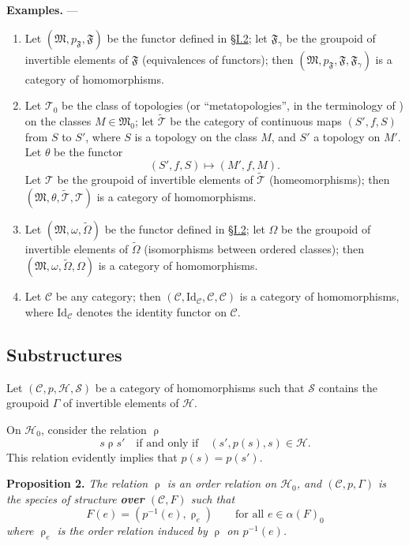 \documentclass[a4paper,oneside,nobib,nofonts,notitlepage,notoc,nols,fleqn,justified]{tufte-book}
\newenvironment{itenv}[1]
  {\phantomsection\par\medskip\noindent\textbf{#1.}\itshape}
  {\par\medskip}
\newenvironment{rmenv}[1]
  {\phantomsection\par\medskip\noindent\textbf{#1.}\rmfamily}
  {\par\medskip}
\newcommand{\oldpage}[1]{{\reversemarginpar\marginnote{\raggedleft\footnotesize\textit{p.~#1}}}}
\newcommand{\unsure}[1]{{\color{purple}\textbf{#1}}}
\newcommand{\CC}{\mathcal{C}}
\newcommand{\HH}{\mathcal{H}}
\renewcommand{\SS}{\mathcal{S}}
\newcommand{\MM}{\mathfrak{M}}
\newcommand{\FF}{\mathfrak{F}}
\newcommand{\TT}{\mathcal{T}}
\newcommand{\relrho}{\mathrel{\rho}}
\newcommand{\Id}{\mathrm{Id}}
\begin{document}
\begin{rmenv}{Examples}
  ---
  \begin{enumerate}
    \item[\normalfont(1)]
      \oldpage{358}
      Let $(\MM,p_\FF,\FF)$ be the functor defined in \hyperref[section:i.2]{§I.2};
      let $\FF_\gamma$ be the groupoid of invertible elements of $\FF$ (equivalences of functors);
      then $(\MM,p_\FF,\FF,\FF_\gamma)$ is a category of homomorphisms.
    \item[\normalfont(2)]
      Let $\TT_0$ be the class of topologies (or ``metatopologies'', in the terminology of \cite{3b}) on the classes $M\in\MM_0$;
      let $\widetilde{\TT}$ be the category of continuous maps $(S',f,S)$ from $S$ to $S'$, where $S$ is a topology on the class $M$, and $S'$ a topology on $M'$.
      Let $\theta$ be the functor
      \[
        (S',f,S)
        \longmapsto(M',f,M).
      \]
      Let $\TT$ be the groupoid of invertible elements of $\widetilde{\TT}$ (homeomorphisms);
      then $(\MM,\theta,\widetilde{\TT},\TT)$ is a category of homomorphisms.
    \item[\normalfont(3)]
      Let $(\MM,\omega,\widetilde{\Omega})$ be the functor defined in \hyperref[section:i.2]{§I.2};
      let $\Omega$ be the groupoid of invertible elements of $\widetilde{\Omega}$ (isomorphisms between ordered classes);
      then $(\MM,\omega,\widetilde{\Omega},\Omega)$ is a category of homomorphisms.
    \item[\normalfont(4)]
      Let $\CC$ be any category;
      then $(\CC,\Id_\CC,\CC,\CC)$ is a category of homomorphisms, where $\Id_\CC$ denotes the identity functor on $\CC$.
  \end{enumerate}
\end{rmenv}



\subsection{Substructures}
\label{section:i.5}

Let $(\CC,p,\HH,\SS)$ be a category of homomorphisms such that $\SS$ contains the groupoid $\Gamma$ of invertible elements of $\HH$.

On $\HH_0$, consider the relation $\relrho$
\[
  s\relrho s'
  \quad\text{if and only if}\quad
  (s',p(s),s)\in\HH.
\]
This relation evidently implies that $p(s)=p(s')$.

\begin{itenv}{Proposition 2}
\label{proposition:2}
  The relation $\relrho$ is an order relation on $\HH_0$, and $(\CC,p,\Gamma)$ is the species of structure \unsure{over} $(\CC,F)$ such that
  \[
    F(e)
    = (p^{-1}(e),\relrho_e)
    \qquad\text{for all $e\in\alpha(F)_0$}
  \]
  where $\relrho_e$ is the order relation induced by $\relrho$ on $p^{-1}(e)$.
\end{itenv}
\end{document}
